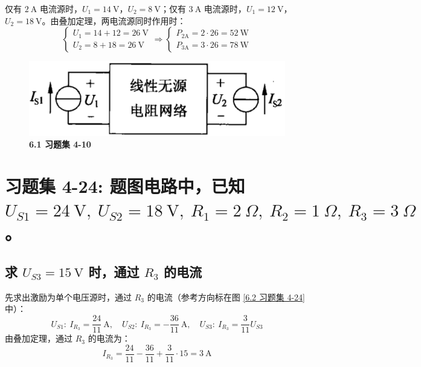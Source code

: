 \documentclass[UTF8]{report}
\theoremstyle{MyLineTheoremStyle} %
\theoremstyle{MyBlockTheoremStyle} %
\theoremstyle{MySubsubsectionStyle} %
\begin{document}
仅有 $2 \ \mathrm{A}$ 电流源时，$U_1 = 14 \ \mathrm{V}$，$U_2 = 8 \ \mathrm{V}$；仅有 $3 \ \mathrm{A}$ 电流源时，$U_1 = 12 \ \mathrm{V}$，$U_2 = 18 \ \mathrm{V}$。由叠加定理，两电流源同时作用时：
\begin{equation}
\begin{cases}
    U_1 = 14 + 12 = 26 \ \mathrm{V} \\ 
    U_2 = 8 + 18 = 26 \ \mathrm{V}
\end{cases}
\Longrightarrow 
\boxed{
    \begin{cases}
        P_{2\mathrm{A}} = 2 \cdot 26 = 52 \ \mathrm{W} \\ 
        P_{3\mathrm{A}} = 3 \cdot 26 = 78 \ \mathrm{W}
    \end{cases}
}
\end{equation}
\begin{figure}[H]\centering
\includegraphics[width=0.4\columnwidth]{assets/6/9506aa8f7aeba32072fee006fa1076c7.png}
\caption{\bfseries 6.1 习题集 4-10}\label{6.1 习题集 4-10}
\end{figure}

\section{习题集 4-24: 题图电路中，已知 $U_{S1} = 24 \ \mathrm{V},\  U_{S2} = 18 \ \mathrm{V},\ R_1 = 2 \ \Omega,\ R_2 = 1 \ \Omega,\ R_3 = 3 \ \Omega$。}

\subsection{求 $U_{S3} = 15 \ \mathrm{V}$ 时，通过 $R_3$ 的电流}

先求出激励为单个电压源时，通过 $R_3$ 的电流（参考方向标在图 \ref{6.2 习题集 4-24} 中）：
\begin{equation}
U_{S1}:\ I_{R_3} = \frac{24}{11} \ \mathrm{A} ,\quad U_{S2}:\ I_{R_3} = -\frac{36}{11} \ \mathrm{A},\quad U_{S3}:\ I_{R_3} = \frac{3}{11} U_{S3}
\end{equation}
由叠加定理，通过 $R_3$ 的电流为：
\begin{equation}
\boxed{
    I_{R_3} = \frac{24}{11} - \frac{36}{11} + \frac{3}{11} \cdot 15 = 3 \ \mathrm{A}
}
\end{equation}
\end{document}
